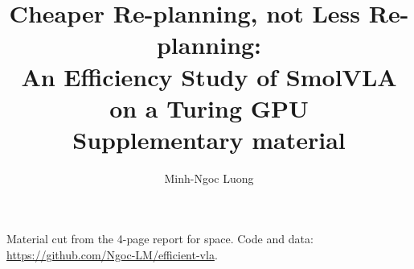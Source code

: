 \documentclass[10pt]{article}
\title{Cheaper Re-planning, not Less Re-planning:\\An Efficiency Study of SmolVLA on a Turing GPU\\[4pt]
\large Supplementary material}
\author{Minh-Ngoc Luong}
\date{}
\begin{document}
\maketitle
\noindent Material cut from the 4-page report for space. Code and data: \url{https://github.com/Ngoc-LM/efficient-vla}.

\end{document}
